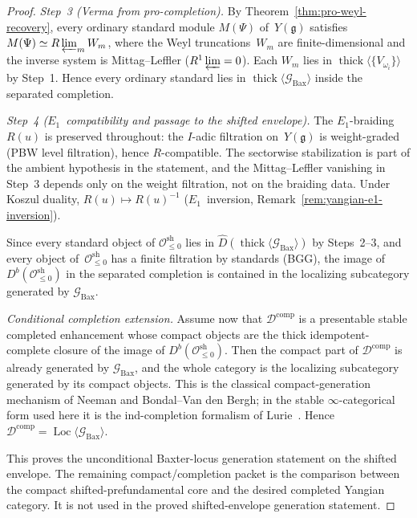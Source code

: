 \begin{proof}
\smallskip\noindent\textit{Step~3 (Verma from pro-completion).}
By Theorem~\ref{thm:pro-weyl-recovery}, every ordinary standard module
$M(\Psi)$ of~$Y(\mathfrak{g})$ satisfies
$M(\Psi) \simeq R\varprojlim_m W_m$, where the Weyl
truncations~$W_m$ are finite-dimensional and the inverse system is
Mittag--Leffler ($R^1 \varprojlim = 0$). Each $W_m$ lies in
$\operatorname{thick}\langle\{V_{\omega_i}\}\rangle$ by Step~1.
Hence every ordinary standard lies in
$\operatorname{thick}\langle \mathcal{G}_{\mathrm{Bax}}\rangle$
inside the separated completion.

\smallskip\noindent\textit{Step~4 ($E_1$~compatibility and passage to the
shifted envelope).}
The $E_1$-braiding $R(u)$ is preserved throughout:
the $I$-adic filtration on~$Y(\mathfrak{g})$ is weight-graded
(PBW level filtration), hence $R$-compatible.
The sectorwise stabilization is part of the ambient hypothesis in the
statement, and the Mittag--Leffler vanishing in Step~3 depends only on the
weight filtration, not on the braiding data.
Under Koszul duality, $R(u) \mapsto R(u)^{-1}$
($E_1$~inversion,
Remark~\ref{rem:yangian-e1-inversion}).

\smallskip
Since every standard object of
$\mathcal{O}^{\mathrm{sh}}_{\leq 0}$ lies in
$\widehat{D}(\operatorname{thick}\langle
\mathcal{G}_{\mathrm{Bax}}\rangle)$ by Steps~2--3, and every
object of~$\mathcal{O}^{\mathrm{sh}}_{\leq 0}$ has a finite
filtration by standards (BGG), the image of
$D^b(\mathcal{O}^{\mathrm{sh}}_{\leq 0})$ in the separated
completion is contained in the localizing subcategory generated by
$\mathcal{G}_{\mathrm{Bax}}$.

\smallskip\noindent\textit{Conditional completion extension.}
Assume now that $\mathcal{D}^{\mathrm{comp}}$ is a presentable stable
completed enhancement whose compact objects are the thick
idempotent-complete closure of the image of
$D^b(\mathcal{O}^{\mathrm{sh}}_{\leq 0})$. Then the compact part of
$\mathcal{D}^{\mathrm{comp}}$ is already generated by
$\mathcal{G}_{\mathrm{Bax}}$, and the whole category is the localizing
subcategory generated by its compact objects. This is the classical
compact-generation mechanism of Neeman and Bondal--Van den Bergh; in
the stable $\infty$-categorical form used here it is the ind-completion
formalism of Lurie~\cite[Prop.~5.3.5.10, Prop.~5.5.7.8]{HTT}. Hence
$\mathcal{D}^{\mathrm{comp}} = \operatorname{Loc}\langle
\mathcal{G}_{\mathrm{Bax}}\rangle$.

This proves the unconditional Baxter-locus generation statement on the
shifted envelope. The remaining compact/completion packet is the
comparison between the compact shifted-prefundamental core and the
desired completed Yangian category. It is not used in the proved
shifted-envelope generation statement.
\end{proof}

